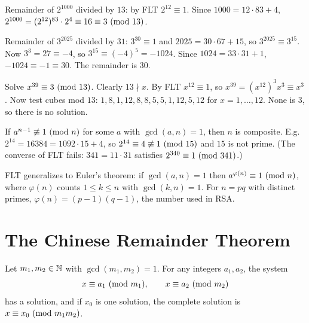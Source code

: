 \begin{example}
Remainder of $2^{1000}$ divided by $13$: by FLT $2^{12} \equiv 1$. Since
$1000 = 12\cdot 83 + 4$, $2^{1000} = (2^{12})^{83}\cdot 2^4 \equiv 16 \equiv 3 \ (\mathrm{mod}\ 13)$.
\end{example}

\begin{example}
Remainder of $3^{2025}$ divided by $31$: $3^{30}\equiv 1$ and $2025 = 30\cdot 67 + 15$, so
$3^{2025} \equiv 3^{15}$. Now $3^3 = 27 \equiv -4$, so
$3^{15} \equiv (-4)^5 = -1024$. Since $1024 = 33 \cdot 31 + 1$, $-1024 \equiv -1 \equiv 30$.
The remainder is $30$.
\end{example}

\begin{example}
Solve $x^{39} \equiv 3 \ (\mathrm{mod}\ 13)$. Clearly $13 \nmid x$. By FLT $x^{12} \equiv 1$, so
$x^{39} = (x^{12})^3 x^3 \equiv x^3$. Now test cubes mod $13$: $1,8,1,12,8,8,5,5,1,12,5,12$
for $x = 1,\dots,12$. None is $3$, so there is no solution.
\end{example}

\begin{example}
If $a^{n-1}\not\equiv 1 \ (\mathrm{mod}\ n)$ for some $a$ with $\gcd(a,n) = 1$, then $n$ is composite. E.g.
$2^{14} = 16384 = 1092\cdot 15 + 4$, so $2^{14} \equiv 4 \not\equiv 1 \ (\mathrm{mod}\ 15)$ and $15$ is not
prime. (The converse of FLT fails: $341 = 11\cdot 31$ satisfies $2^{340} \equiv 1 \ (\mathrm{mod}\ 341)$.)
\end{example}

\begin{aside}
FLT generalizes to Euler's theorem: if $\gcd(a,n) = 1$ then $a^{\varphi(n)} \equiv 1 \ (\mathrm{mod}\ n)$,
where $\varphi(n)$ counts $1 \le k \le n$ with $\gcd(k,n) = 1$. For $n = pq$ with distinct primes,
$\varphi(n) = (p-1)(q-1)$, the number used in RSA.
\end{aside}

\section{The Chinese Remainder Theorem}

\begin{theorem}
Let $m_1, m_2 \in \mathbb{N}$ with $\gcd(m_1,m_2) = 1$. For any integers $a_1,a_2$, the system
\[ x \equiv a_1 \ (\mathrm{mod}\ m_1), \qquad x \equiv a_2 \ (\mathrm{mod}\ m_2) \]
has a solution, and if $x_0$ is one solution, the complete solution is
$x \equiv x_0 \ (\mathrm{mod}\ m_1m_2)$.
\end{theorem}

